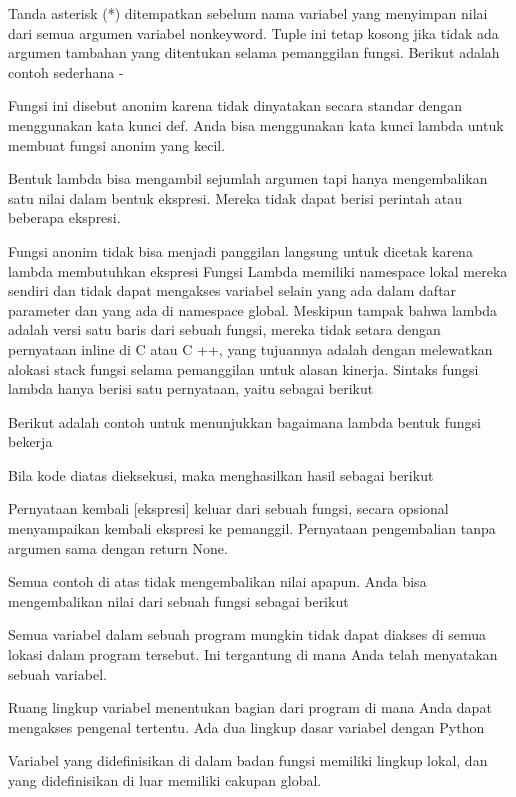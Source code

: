 Tanda asterisk (*) ditempatkan sebelum nama variabel yang menyimpan nilai dari semua argumen variabel nonkeyword. Tuple ini tetap kosong jika tidak ada argumen tambahan yang ditentukan selama pemanggilan fungsi. Berikut adalah contoh sederhana - \par

Fungsi ini disebut anonim karena tidak dinyatakan secara standar dengan menggunakan kata kunci def. Anda bisa menggunakan kata kunci lambda untuk membuat fungsi anonim yang kecil. \par

Bentuk lambda bisa mengambil sejumlah argumen tapi hanya mengembalikan satu nilai dalam bentuk ekspresi. Mereka tidak dapat berisi perintah atau beberapa ekspresi. \par
Fungsi anonim tidak bisa menjadi panggilan langsung untuk dicetak karena lambda  membutuhkan ekspresi Fungsi Lambda memiliki namespace lokal mereka sendiri dan tidak dapat mengakses variabel selain yang ada dalam daftar parameter dan yang ada di namespace global. 
Meskipun tampak bahwa lambda adalah versi satu baris dari sebuah fungsi, mereka tidak setara dengan pernyataan inline di C atau C ++, yang tujuannya adalah dengan  melewatkan alokasi stack fungsi selama pemanggilan untuk alasan kinerja. 
Sintaks fungsi lambda hanya berisi satu pernyataan, yaitu sebagai berikut 

Berikut adalah contoh untuk menunjukkan bagaimana lambda bentuk fungsi bekerja 

Bila kode diatas dieksekusi, maka menghasilkan hasil sebagai berikut 

Pernyataan kembali [ekspresi] keluar dari sebuah fungsi, secara opsional menyampaikan kembali ekspresi ke pemanggil. Pernyataan pengembalian tanpa argumen sama dengan return None. \par

Semua contoh di atas tidak mengembalikan nilai apapun. Anda bisa mengembalikan nilai dari sebuah fungsi sebagai berikut

Semua variabel dalam sebuah program mungkin tidak dapat diakses di semua lokasi dalam program tersebut. Ini tergantung di mana Anda telah menyatakan sebuah variabel. 
 
Ruang lingkup variabel menentukan bagian dari program di mana Anda dapat mengakses pengenal tertentu. Ada dua lingkup dasar variabel dengan Python 

Variabel yang didefinisikan di dalam badan fungsi memiliki lingkup lokal, dan yang didefinisikan di luar memiliki cakupan global. 

